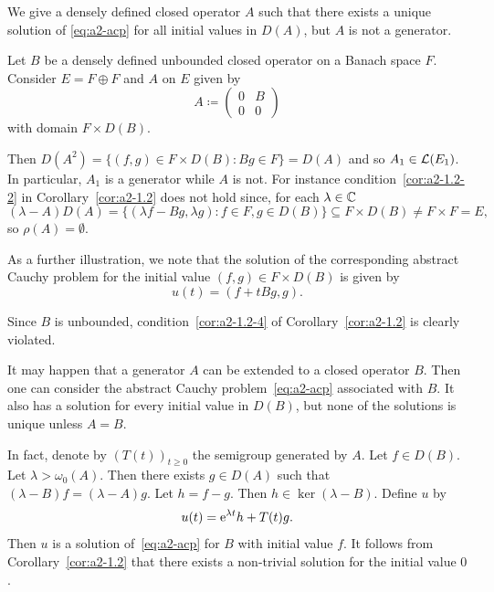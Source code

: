 \begin{example}\label{ex:a2-1.4}
We give a densely defined closed operator $ A $ such that there exists a unique solution of \eqref{eq:a2-acp} for all initial values in $ D(A) $, but $ A $ is not a generator.

Let $ B $ be a densely defined unbounded closed operator on a Banach space $ F $.
Consider $ E = F \oplus F $ and $ A $ on $ E $ given by
\[
    A \coloneq \begin{pmatrix} 0 & B \\ 0 & 0 \end{pmatrix}
\]
with domain $ F \times D(B) $.

Then $ D(A^{2}) = \{(f,g) \in F \times D(B) \colon Bg \in F\} = D(A) $ and so $ A_{1} \in \mathcal{L}(E_{1}) $.
In particular, $ A_{1} $ is a generator while
$ A $ is not. For instance
condition~\ref{cor:a2-1.2-2}   in Corollary~\ref{cor:a2-1.2}   does not hold since, for each $ \lambda \in \mathbb{C} $
\[
    (\lambda-A)D(A) = \{(\lambda f-Bg,\lambda g) \colon f \in F, g \in D(B)\} \subseteq F \times D(B) \neq F \times F = E ,
\]
so $ \rho(A) = \emptyset $.

As a further illustration, we note that the solution of the corresponding abstract Cauchy problem for the initial value $ (f,g) \in F \times D(B) $ is given by 
\[
u(t) = (f + tBg,g) .
\] 

Since $ B $ is unbounded, condition~\ref{cor:a2-1.2-4}  of Corollary~\ref{cor:a2-1.2}  is clearly violated.
\end{example}
\begin{remark}\label{rem:a2-1.5} 
It may happen that a generator $A$ can be extended to a closed operator $B$.
Then one can consider the abstract Cauchy problem~\eqref{eq:a2-acp} associated with $B$.
It also has a solution for every initial value in $D(B)$, but none of the solutions is unique unless $A = B$.

In fact, denote by $(T(t))_{t \geq 0}$ the semigroup generated by $A$.
Let $f \in D(B)$.
Let $\lambda > \omega_{0}(A)$.
Then there exists $g \in D(A)$ such that $(\lambda-B)f = (\lambda-A)g$.
Let $h = f - g$.
Then $h \in \ker(\lambda-B)$.
Define $u$ by 
%
\[
	u(t) = \mathrm{e}^{\lambda t}h + T(t)g .
\]
%
Then $u$ is a solution of~\eqref{eq:a2-acp} for $B$ with initial value $f$.
It follows from Corollary~\ref{cor:a2-1.2} that there exists a non-trivial solution for the initial value $0$.
\end{remark}
